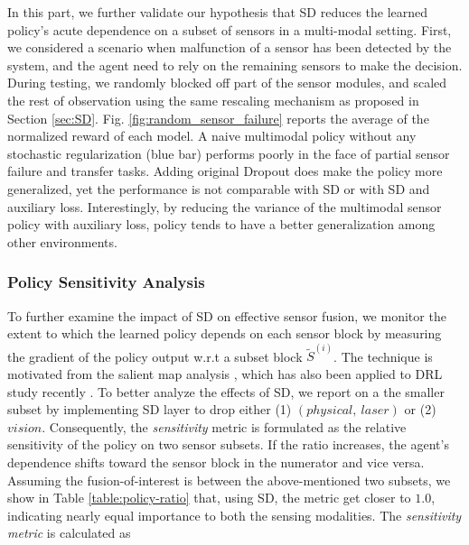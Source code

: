 \documentclass[../thesis.tex]{subfiles}
\begin{document}
In this part, we further validate our hypothesis that SD reduces the learned policy's acute dependence on a subset of sensors in a multi-modal setting. First, we considered a scenario when malfunction of a sensor has been detected by the system, and the agent need to rely on the remaining sensors to make the decision. During testing, we randomly blocked off part of the sensor modules, and scaled the rest of observation using the same rescaling mechanism as proposed in Section \ref{sec:SD}. Fig. \ref{fig:random_sensor_failure} reports the average of the normalized reward of each model. A naive multimodal policy without any stochastic regularization (blue bar) performs poorly in the face of partial sensor failure and transfer tasks. Adding original Dropout does make the policy more generalized, yet the performance is not comparable with SD or with SD and auxiliary loss. Interestingly, by reducing the variance of the multimodal sensor policy with auxiliary loss, policy tends to have a better generalization among other environments.

\subsubsection{Policy Sensitivity Analysis}
To further examine the impact of SD on effective sensor fusion, we monitor the extent to which the learned policy depends on each sensor block by measuring the gradient of the policy output w.r.t a subset block $\tilde{S}^{(i)}$. The technique is motivated from the salient map analysis \cite{simonyan2013deep}, which has also been applied to DRL study recently \cite{WangFL15}. 
To better analyze the effects of SD, we report on a the smaller subset by implementing SD layer to drop either (1) $(physical,~ laser)$ or (2) $vision$. Consequently, the \emph{sensitivity} metric is formulated as the relative sensitivity of the policy on two sensor subsets. If the ratio increases, the agent's dependence shifts toward the sensor block in the numerator and vice versa. Assuming the fusion-of-interest is between the above-mentioned two subsets, we show in Table \ref{table:policy-ratio} that, using SD, the metric get closer to $1.0$, indicating nearly equal importance to both the sensing modalities. The \textit{sensitivity metric} is calculated as 
\end{document}
